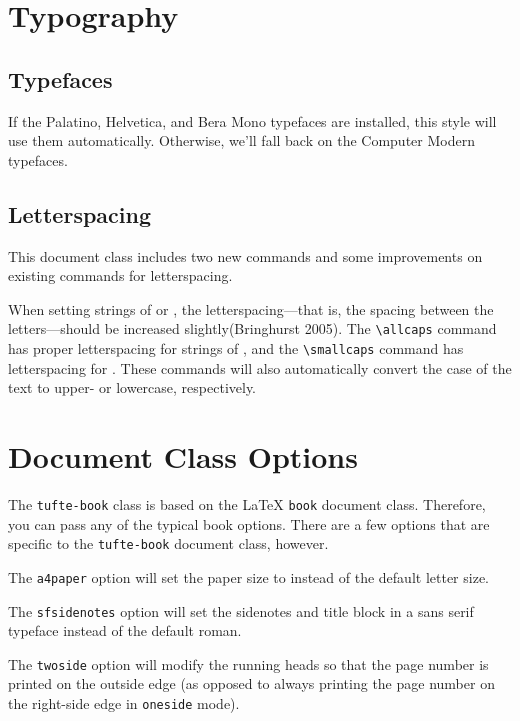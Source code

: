 \documentclass[
  twoside,
  symmetric]{tufte-book}
\begin{document}
\section{Typography}\label{sec:typography}

\subsection{Typefaces}\label{sec:typefaces}

If the Palatino, Helvetica, and Bera Mono typefaces are installed, this
style will use them automatically. Otherwise, we'll fall back on the
Computer Modern typefaces.

\subsection{Letterspacing}\label{sec:letterspacing}

This document class includes two new commands and some improvements on
existing commands for letterspacing.

When setting strings of  or ,
the letterspacing---that is, the spacing between the letters---should be
increased slightly(Bringhurst 2005). The
\texttt{\textbackslash{}allcaps} command has proper letterspacing for
strings of , and the
\texttt{\textbackslash{}smallcaps} command has letterspacing for
. These commands will also
automatically convert the case of the text to upper- or lowercase,
respectively.

\section{Document Class Options}\label{sec:options}

The \texttt{tufte-book} class is based on the LaTeX \texttt{book}
document class. Therefore, you can pass any of the typical book options.
There are a few options that are specific to the \texttt{tufte-book}
document class, however.

The \texttt{a4paper} option will set the paper size to 
instead of the default  letter size.

The \texttt{sfsidenotes} option will set the sidenotes and title block
in a sans serif typeface instead of the default roman.

The \texttt{twoside} option will modify the running heads so that the
page number is printed on the outside edge (as opposed to always
printing the page number on the right-side edge in \texttt{oneside}
mode).
\end{document}
